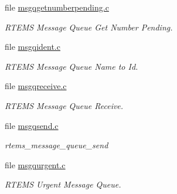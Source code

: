 \begin{DoxyCompactItemize}
file \mbox{\hyperlink{msgqgetnumberpending_8c}{msgqgetnumberpending.\+c}}
\begin{DoxyCompactList}\small\item\em R\+T\+E\+MS Message Queue Get Number Pending. \end{DoxyCompactList}\item 
file \mbox{\hyperlink{msgqident_8c}{msgqident.\+c}}
\begin{DoxyCompactList}\small\item\em R\+T\+E\+MS Message Queue Name to Id. \end{DoxyCompactList}\item 
file \mbox{\hyperlink{msgqreceive_8c}{msgqreceive.\+c}}
\begin{DoxyCompactList}\small\item\em R\+T\+E\+MS Message Queue Receive. \end{DoxyCompactList}\item 
file \mbox{\hyperlink{msgqsend_8c}{msgqsend.\+c}}
\begin{DoxyCompactList}\small\item\em rtems\+\_\+message\+\_\+queue\+\_\+send \end{DoxyCompactList}\item 
file \mbox{\hyperlink{msgqurgent_8c}{msgqurgent.\+c}}
\begin{DoxyCompactList}\small\item\em R\+T\+E\+MS Urgent Message Queue. \end{DoxyCompactList}\end{DoxyCompactItemize}
